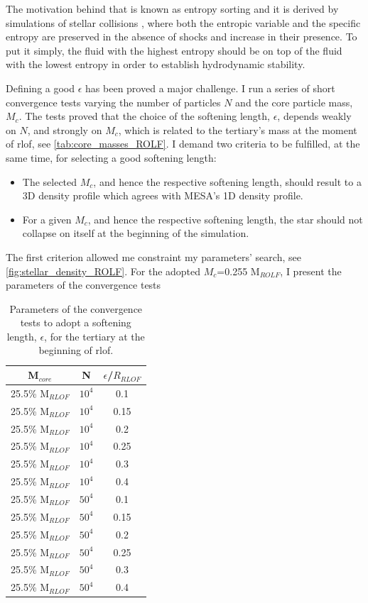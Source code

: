 The motivation behind that is known as entropy sorting and it is derived by simulations of stellar collisions \citep{lombardi1995collisions,lombardi2003modelling,lombardi2006stellar,gaburov2008mixing,gaburov2010onset}, where both the entropic variable and the specific entropy are preserved in the absence of shocks and increase in their presence. To put it simply, the fluid with the highest entropy should be on top of the fluid with the lowest entropy in order to establish hydrodynamic stability. 

Defining a good $\epsilon$ has been proved a major challenge. I run a series of short convergence tests varying the number of particles $N$ and the core particle mass, $M_c$. The tests proved that the choice of the softening length, $\epsilon$, depends weakly on $N$, and strongly on $M_c$, which is related to the tertiary's mass at the moment of \ac{rlof}, see \cref{tab:core_masses_ROLF}. I demand two criteria to be fulfilled, at the same time, for selecting a good softening length:
\begin{itemize}
    \item The selected $M_c$, and hence the respective softening length, should result to a 3D density profile which agrees with MESA's 1D density profile.
    \item For a given $M_c$, and hence the respective softening length, the star should not collapse on itself at the beginning of the simulation.
\end{itemize}
The first criterion allowed me constraint my parameters' search, see \cref{fig:stellar_density_ROLF}. For the adopted $M_c$=0.255 M$_{ROLF}$, I present the parameters of the convergence tests
\begin{table}[H]
    \centering
    \begin{tabular}{| c | c | c |}
       M$_{core}$  & N & $\epsilon$/$R_{RLOF}$ \\
       \hline
       25.5\% M$_{RLOF}$ & $10^4$ & 0.1\\
       25.5\% M$_{RLOF}$ & $10^4$ & 0.15\\
       25.5\% M$_{RLOF}$ & $10^4$ & 0.2\\
       25.5\% M$_{RLOF}$ & $10^4$ & 0.25\\
       25.5\% M$_{RLOF}$ & $10^4$ & 0.3\\
       25.5\% M$_{RLOF}$ & $10^4$ & 0.4\\
       \hline
       25.5\% M$_{RLOF}$ & $50^4$ & 0.1\\
       25.5\% M$_{RLOF}$ & $50^4$ & 0.15\\
       25.5\% M$_{RLOF}$ & $50^4$ & 0.2\\
       25.5\% M$_{RLOF}$ & $50^4$ & 0.25\\
       25.5\% M$_{RLOF}$ & $50^4$ & 0.3\\
       25.5\% M$_{RLOF}$ & $50^4$ & 0.4\\
    \end{tabular}
    \caption{ Parameters of the convergence tests to adopt a softening length, $\epsilon$, for the tertiary at the beginning of \ac{rlof}.}
\label{tab:smoothing_length_exploration}
\end{table}
